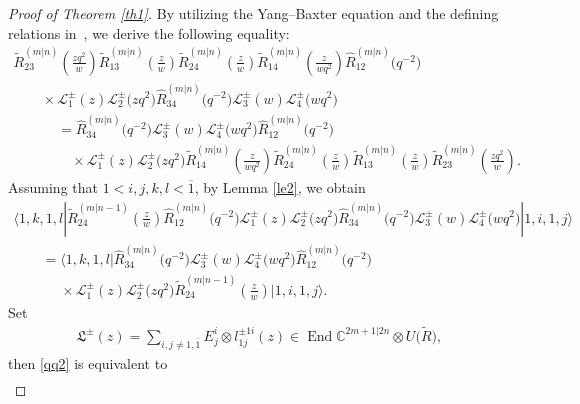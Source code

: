 \documentclass[pdftex]{sigma}
\numberwithin{equation}{section}
\begin{document}
\begin{proof}[Proof of Theorem \ref{th1}]
By utilizing the Yang--Baxter equation and the defining relations in~, we derive the following equality:
\begin{gather*}
 \widetilde{R}_{23}^{(m|n)}\left(\frac{zq^2}{w}\right)\widetilde{R}_{13}^{(m|n)}\left(\frac{z}{w}\right)\widetilde{R}_{24}^{(m|n)}
 \left(\frac{z}{w}\right)\widetilde{R}_{14}^{(m|n)}\left(\frac{z}{wq^2}\right)\widehat{R}_{12}^{(m|n)}\bigl(q^{-2}\bigr) \\
 \qquad\times \mathcal{L}^{\pm}_1(z)\mathcal{L}^{\pm}_2\bigl(zq^2\bigr)\widehat{R}_{34}^{(m|n)}\bigl(q^{-2}\bigr)\mathcal{L}^{\pm}_3(w)\mathcal{L}^{\pm}_4\bigl(wq^{2}\bigr) \\
\qquad\phantom{\times}{}= \widehat{R}_{34}^{(m|n)}\bigl(q^{-2}\bigr)\mathcal{L}^{\pm}_3(w)\mathcal{L}^{\pm}_4\bigl(wq^{2}\bigr)\widehat{R}_{12}^{(m|n)}\bigl(q^{-2}\bigr) \\
\qquad\phantom{\times=}{}\times \mathcal{L}^{\pm}_1(z)\mathcal{L}^{\pm}_2\bigl(zq^2\bigr)\widetilde{R}_{14}^{(m|n)}\left(\frac{z}{wq^2}\right)\widetilde{R}_{24}^{(m|n)}
 \left(\frac{z}{w}\right)
 \widetilde{R}_{13}^{(m|n)}\left(\frac{z}{w}\right)\widetilde{R}_{23}^{(m|n)}\left(\frac{zq^2}{w}\right).
\end{gather*}
Assuming that $1 < i, j, k, l < \overline{1}$, by Lemma \ref{le2}, we obtain
\begin{gather}
 \langle 1, k, 1, l |\widetilde{R}_{24}^{(m|n-1)}\left(\frac{z}{w}\right)\widehat{R}_{12}^{(m|n)}\bigl(q^{-2}\bigr)
 \mathcal{L}^{\pm}_1(z)\mathcal{L}^{\pm}_2\bigl(zq^2\bigr)\widehat{R}_{34}^{(m|n)}\bigl(q^{-2}\bigr)\mathcal{L}^{\pm}_3(w)\mathcal{L}^{\pm}_4\bigl(wq^{2}\bigr)| 1, i, 1, j\rangle \nonumber\\
\qquad = \langle 1, k, 1, l |\widehat{R}_{34}^{(m|n)}\bigl(q^{-2}\bigr)\mathcal{L}^{\pm}_3(w)\mathcal{L}^{\pm}_4\bigl(wq^{2}\bigr)\widehat{R}_{12}^{(m|n)}\bigl(q^{-2}\bigr)\nonumber\\
\phantom{\qquad =}{}\times
 \mathcal{L}^{\pm}_1(z)\mathcal{L}^{\pm}_2\bigl(zq^2\bigr)\widetilde{R}_{24}^{(m|n-1)}\left(\frac{z}{w}\right)| 1, i, 1, j\rangle.\label{qq2}
\end{gather}
Set
\begin{gather*}
 \mathfrak{L}^{\pm}(z)=\sum\limits_{i,j\neq1,\bar{1}}E^i_j\otimes l^{\pm1i}_{1j}(z)\in \operatorname{End}\mathbb{C}^{2m+1|2n}\otimes U\bigl(\widetilde{R}\bigr),
\end{gather*}
then \eqref{qq2} is equivalent to
\begin{gather}\label{22}

\end{gather}
\end{proof}
\end{document}
